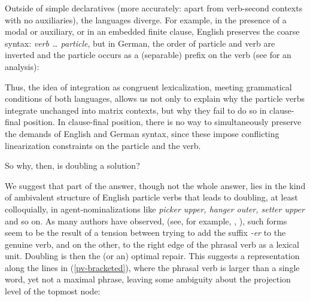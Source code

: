 \documentclass[output=paper]{langscibook}
\begin{document}
Outside of simple declaratives (more accurately: apart from verb-second contexts with no auxiliaries), the languages diverge. For example, in the presence of a modal or auxiliary, or in an embedded finite clause, English preserves the coarse syntax: \textit{verb {\ldots} particle}, but in German, the order of particle and verb are inverted and the particle occurs as a (separable) prefix on the verb (see \citealp{wurmbrand98} for an analysis):

\ea
{}
\z\z 

Thus, the idea of integration as congruent lexicalization, meeting grammatical conditions of both languages, allows us not only to explain why the particle verbs integrate unchanged into matrix contexts, but why they fail to do so in clause-final position. In clause-final position, there is no way to simultaneously preserve the demands of English and German syntax, since these impose conflicting linearization constraints on the particle and the verb. 

So why, then, is doubling a solution?\largerpage

We suggest that part of the answer, though not the whole answer, lies in the kind of ambivalent structure of English particle verbs that leads to doubling, at least colloquially, in agent-nominalizations like \textit{picker upper, hanger outer, setter upper} and so on. As many authors have observed, (see, for example, \citealp{sproat85}, \citealp[160]{ackneel04}), such forms seem to be the result of a tension between trying to add the suffix \textit{-er} to the genuine verb, and on the other, to the right edge of the phrasal verb as a lexical unit. Doubling is then the (or an) optimal repair. This suggests a representation along the lines in (\ref{pv-bracketed}), where the phrasal verb is larger than a single word, yet not a maximal phrase, leaving some ambiguity about the projection level of the topmost node: 
\end{document}
